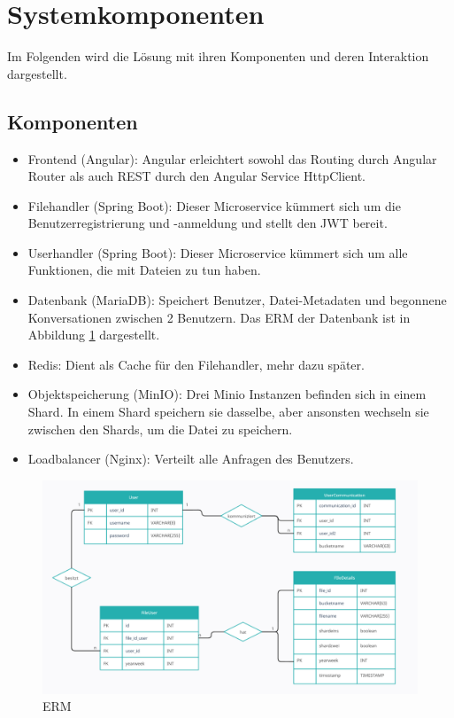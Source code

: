 \documentclass[12pt]{report}
\begin{document}
	\section{Systemkomponenten}
		Im Folgenden wird die Lösung mit ihren Komponenten und deren Interaktion dargestellt.
		\subsection{Komponenten}
			\begin{itemize}
				\item Frontend (Angular): Angular erleichtert sowohl das Routing durch Angular Router als auch REST durch den Angular Service HttpClient.
				\item Filehandler (Spring Boot): Dieser Microservice kümmert sich um die Benutzerregistrierung und -anmeldung und stellt den JWT bereit.
				\item Userhandler (Spring Boot): Dieser Microservice kümmert sich um alle Funktionen, die mit Dateien zu tun haben.
				\item Datenbank (MariaDB):  Speichert Benutzer, Datei-Metadaten und begonnene Konversationen zwischen 2 Benutzern. Das ERM der Datenbank ist in Abbildung \ref{fig:erm} dargestellt.
				\item Redis: Dient als Cache für den Filehandler, mehr dazu später.
				\item Objektspeicherung (MinIO): Drei Minio Instanzen befinden sich in einem Shard. In einem Shard speichern sie dasselbe, aber ansonsten wechseln sie zwischen den Shards, um die Datei zu speichern.
				\item Loadbalancer (Nginx): Verteilt alle Anfragen des Benutzers.
			\end{itemize}
						
			\begin{figure}[h]
				\centering
				\includegraphics[width=\linewidth]{erm}
				\caption{ERM}
				\label{fig:erm}
			\end{figure}
			
\end{document}
